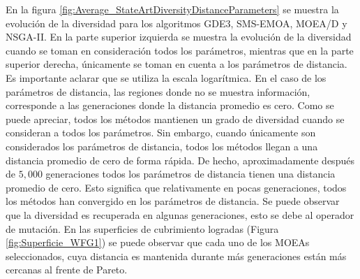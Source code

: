 En la figura \ref{fig:Average_StateArtDiversityDistanceParameters} se muestra la evolución de la diversidad para los algoritmos GDE3, SMS-EMOA, MOEA/D y NSGA-II.
%
En la parte superior izquierda se muestra la evolución de la diversidad cuando se toman en consideración todos los parámetros, mientras que en la parte superior derecha, únicamente se toman en cuenta a los parámetros de distancia.
%
Es importante aclarar que se utiliza la escala logarítmica.
%
En el caso de los parámetros de distancia, las regiones donde no se muestra información, corresponde a las generaciones donde la distancia promedio es cero.
%
Como se puede apreciar, todos los métodos mantienen un grado de diversidad cuando se consideran a todos los parámetros.
%
Sin embargo, cuando únicamente son considerados los parámetros de distancia, todos los métodos llegan a una distancia promedio de cero de forma rápida.
%
De hecho, aproximadamente después de $5,000$ generaciones todos los parámetros de distancia tienen una distancia promedio de cero.
%
Esto significa que relativamente en pocas generaciones, todos los métodos han convergido en los parámetros de distancia.
%
Se puede observar que la diversidad es recuperada en algunas generaciones, esto se debe al operador de mutación.
%
En las superficies de cubrimiento logradas (Figura \ref{fig:Superficie_WFG1}) se puede observar que cada uno de los MOEAs seleccionados, cuya distancia es mantenida durante más generaciones están más cercanas al frente de Pareto.
